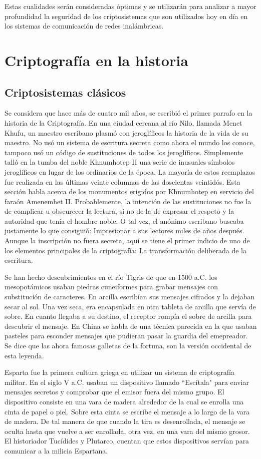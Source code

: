 Estas cualidades serán consideradas óptimas y se utilizarán para analizar a mayor profundidad la seguridad de los criptosistemas que son utilizados hoy en día en los sistemas de comunicación de redes inalámbricas.

\section{Criptografía en la historia}
\subsection{Criptosistemas clásicos}
Se considera que hace más de cuatro mil años, se escribió el primer parrafo en la historia de la Criptografía. En una ciudad cercana al río Nilo, llamada Menet Khufu, un maestro escribano plasmó con jeroglíficos la historia de la vida de su maestro. No usó un sistema de escritura secreta como ahora el mundo los conoce, tampoco usó un código de sustituciones de todos los jeroglíficos. Simplemente talló en la tumba del noble Khnumhotep II una serie de inusuales símbolos jeroglíficos en lugar de los ordinarios de la época. La mayoría de estos reemplazos fue realizada en las últimas veinte columnas de las doscientas veintidós. Esta sección habla acerca de los monumentos erigidos por Khnumhotep en servicio del faraón Amenemhet II.
Probablemente, la intención de las sustituciones no fue la de complicar u obscurecer la lectura, si no de la de expresar el respeto y la autoridad que tenía el hombre noble. O tal vez, el anónimo escribano buscaba justamente lo que consiguió: Impresionar a sus lectores miles de años después. 
Aunque la inscripción no fuera secreta, aquí se tiene el primer indicio de uno de los elementos principales de la criptografía: La transformación deliberada de la escritura.

Se han hecho descubrimientos en el río Tigris de que en 1500 a.C. los mesopotámicos usaban piedras cuneiformes para grabar mensajes con substitución de caracteres. En arcilla escribían sus mensajes cifrados y la dejaban secar al sol. Una vez seca, era encapsulada en otra tableta de arcilla que servía de sobre. En cuanto llegaba a su destino, el receptor rompía el sobre de arcilla para descubrir el mensaje. En China se habla de una técnica parecida en la que usaban pasteles para esconder mensajes que pudieran pasar la guardia del emepreador. Se dice que las ahora famosas galletas de la fortuna, son la versión occidental de esta leyenda.

Esparta fue la primera cultura griega en utilizar un sistema de criptografía militar. En el siglo V a.C. usaban un dispositivo llamado ``Escítala"  para enviar mensajes secretos y comprobar que el emisor fuera del mismo grupo. El dispositivo consiste en una vara de madera alrededor de la cual se enrolla una cinta de papel o piel. Sobre esta cinta se escribe el mensaje a lo largo de la vara de madera. De tal manera de que cuando la tira es desenrollada, el mensaje se oculta hasta que vuelve a ser enrollada, otra vez, en una vara del mismo grosor. El historiador Tucídides y Plutarco, cuentan que estos dispositivos servían para comunicar a la milicia Espartana.

